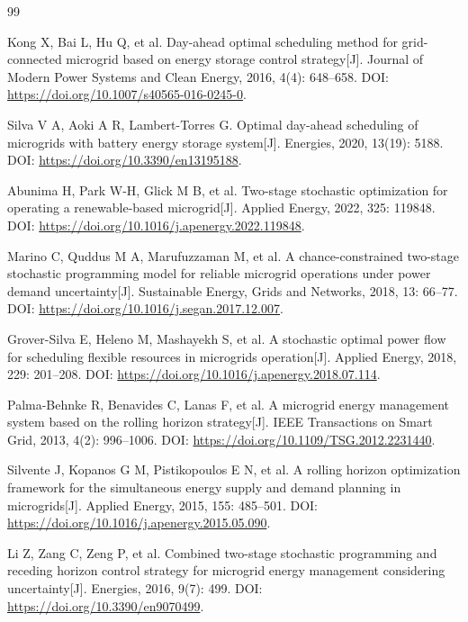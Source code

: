 \begingroup
\small\linespread{1.15}\selectfont
\begin{thebibliography}{99}
\setlength{\itemsep}{4pt}
\setlength{\parsep}{0pt}

Kong X, Bai L, Hu Q, et al.
Day-ahead optimal scheduling method for grid-connected microgrid based on energy storage control strategy[J].
Journal of Modern Power Systems and Clean Energy, 2016, 4(4): 648--658.
DOI: \url{https://doi.org/10.1007/s40565-016-0245-0}.

Silva V A, Aoki A R, Lambert-Torres G.
Optimal day-ahead scheduling of microgrids with battery energy storage system[J].
Energies, 2020, 13(19): 5188.
DOI: \url{https://doi.org/10.3390/en13195188}.

Abunima H, Park W-H, Glick M B, et al.
Two-stage stochastic optimization for operating a renewable-based microgrid[J].
Applied Energy, 2022, 325: 119848.
DOI: \url{https://doi.org/10.1016/j.apenergy.2022.119848}.

Marino C, Quddus M A, Marufuzzaman M, et al.
A chance-constrained two-stage stochastic programming model for reliable microgrid operations under power demand uncertainty[J].
Sustainable Energy, Grids and Networks, 2018, 13: 66--77.
DOI: \url{https://doi.org/10.1016/j.segan.2017.12.007}.

Grover-Silva E, Heleno M, Mashayekh S, et al.
A stochastic optimal power flow for scheduling flexible resources in microgrids operation[J].
Applied Energy, 2018, 229: 201--208.
DOI: \url{https://doi.org/10.1016/j.apenergy.2018.07.114}.

Palma-Behnke R, Benavides C, Lanas F, et al.
A microgrid energy management system based on the rolling horizon strategy[J].
IEEE Transactions on Smart Grid, 2013, 4(2): 996--1006.
DOI: \url{https://doi.org/10.1109/TSG.2012.2231440}.

Silvente J, Kopanos G M, Pistikopoulos E N, et al.
A rolling horizon optimization framework for the simultaneous energy supply and demand planning in microgrids[J].
Applied Energy, 2015, 155: 485--501.
DOI: \url{https://doi.org/10.1016/j.apenergy.2015.05.090}.

Li Z, Zang C, Zeng P, et al.
Combined two-stage stochastic programming and receding horizon control strategy for microgrid energy management considering uncertainty[J].
Energies, 2016, 9(7): 499.
DOI: \url{https://doi.org/10.3390/en9070499}.


\end{thebibliography}
